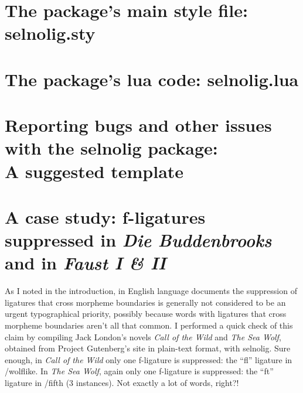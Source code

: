 \documentclass[11pt]{article}
\newcommand{\pkg}[1]{\textsf{#1}}
\begin{document}
\bigskip

\begin{multicols}{2}
\end{multicols}

\clearpage
\section[The package's main style file: selnolig.sty]
{The package's main style file: \pkg{selnolig.sty}}
\label{sec:sty}


\clearpage
\section[The package's lua code: selnolig.lua]{The package's lua code: \pkg{selnolig.lua}}
\label{sec:luacode}


\clearpage

\section[Reporting bugs and other issues with the selnolig package: A suggested template]{Reporting bugs and other issues with the \pkg{selnolig} package:\\A suggested template} \label{sec:template}


\clearpage
\selnoligon
\section{A case study: f-ligatures suppressed in \emph{Die Buddenbrooks} and in \emph{Faust I \& II}} \label{sec:budd}

\ebg

As I noted in the introduction, in English language documents the suppression of ligatures that cross morpheme boundaries is generally not considered to be an urgent typographical priority, possibly because words with ligatures that cross morpheme boundaries aren't all that common. I performed a quick check of this claim by compiling Jack London's novels \emph{Call of the Wild} and \emph{The Sea Wolf}, obtained from Project Gutenberg's site in plain-text format, with \pkg{selnolig}. Sure enough, in \emph{Call of the Wild} only one f-ligature is suppressed: the \enquote{fl} ligature in \slash wolflike. In \emph{The Sea Wolf}, again only one f-ligature is suppressed: the \enquote{ft} ligature in \slash fifth (3 instances). Not exactly a lot of words, right?!
\end{document}

